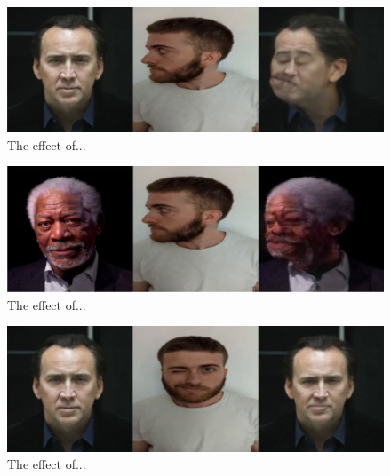\documentclass[english,12pt]{article}
\begin{document}
\begin{figure}[htb]
  \begin{centering}
      \includegraphics[scale=0.29]{images/Oren_tilt_cage.PNG}
  \par\end{centering}
  \caption{\label{fig:Oren_tilt_cage}The effect of...}
\end{figure}

\begin{figure}[htb]
  \begin{centering}
      \includegraphics[scale=0.29]{images/Oren_tilt_freeman.PNG}
  \par\end{centering}
  \caption{\label{fig:Oren_tilt_freeman}The effect of...}
\end{figure}

\begin{figure}[htb]
  \begin{centering}
      \includegraphics[scale=0.29]{images/Oren_wink_cage.PNG}
  \par\end{centering}
  \caption{\label{fig:Oren_wink_cage}The effect of...}
\end{figure}
\end{document}
